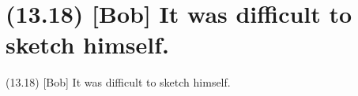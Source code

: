 \documentclass{article}
\begin{document}
\clearpage

%
%

\section*{(13.18) [Bob] It was difficult to sketch himself.}

\bigbreak
\begin{enumerate*}
\item[(13.18)] [Bob] It was difficult to sketch himself.
\end{enumerate*}
\bigbreak
\end{document}
